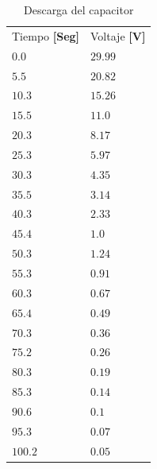 \documentclass[twocolumn, 12pt]{article}
\begin{document}
\begin{table}[H]
    \centering
    \begin{tabularx}{0.9\linewidth}{|>{\centering\arraybackslash}X|>{\centering\arraybackslash}X|}

        \hline
        \multicolumn{2}{|c|}{Descarga}               \\\hline
        Tiempo \textbf{[Seg]} & Voltaje \textbf{[V]} \\\hline
        $0.0$                 & $29.99$              \\\hline
        $5.5$                 & $20.82$              \\\hline
        $10.3$                & $15.26$              \\\hline
        $15.5$                & $11.0$               \\\hline
        $20.3$                & $8.17$               \\\hline
        $25.3$                & $5.97$               \\\hline
        $30.3$                & $4.35$               \\\hline
        $35.5$                & $3.14$               \\\hline
        $40.3$                & $2.33$               \\\hline
        $45.4$                & $1.0$                \\\hline
        $50.3$                & $1.24$               \\\hline
        $55.3$                & $0.91$               \\\hline
        $60.3$                & $0.67$               \\\hline
        $65.4$                & $0.49$               \\\hline
        $70.3$                & $0.36$               \\\hline
        $75.2$                & $0.26$               \\\hline
        $80.3$                & $0.19$               \\\hline
        $85.3$                & $0.14$               \\\hline
        $90.6$                & $0.1$                \\\hline
        $95.3$                & $0.07$               \\\hline
        $100.2$               & $0.05$               \\\hline
    \end{tabularx}

    \caption{Descarga del capacitor}
    \label{tab:datos__Descarga}
\end{table}
\end{document}
